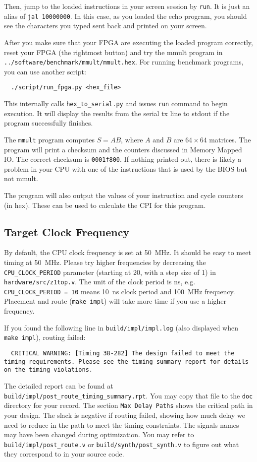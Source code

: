 Then, jump to the loaded instructions in your screen session by \verb|run|.
It is just an alias of \verb|jal 10000000|.
In this case, as you loaded the echo program, you should see the characters you typed
sent back and printed on your screen.

After you make sure that your FPGA are executing the loaded program correctly,
reset your FPGA (the rightmost button) and try the mmult program
in \verb|../software/benchmark/mmult/mmult.hex|.
For running benchmark programs, you can use another script:
\begin{verbatim}
  ./script/run_fpga.py <hex_file>
\end{verbatim}
This internally calls \verb|hex_to_serial.py| and issues \verb|run| command to begin execution.
It will display the results from the serial tx line to stdout if the program successfully finishes.

The \verb|mmult| program computes $S=AB$, where $A$ and $B$ are $64 \times 64$ matrices.
The program will print a checksum and the counters discussed in Memory Mapped IO.
The correct checksum is \verb|0001f800|.
If nothing printed out, there is likely a problem in your CPU with one of the instructions that is used by the BIOS but not mmult.

The program will also output the values of your instruction and cycle counters (in hex).
These can be used to calculate the CPI for this program.

\subsection{Target Clock Frequency}\label{sec:target_clock_frequency}
By default, the CPU clock frequency is set at 50~MHz.
It should be easy to meet timing at 50~MHz.
Please try higher frequencies by decreasing the \verb|CPU_CLOCK_PERIOD| parameter
(starting at 20, with a step size of 1) in \verb|hardware/src/z1top.v|.
The unit of the clock period is ns,
e.g. \verb|CPU_CLOCK_PERIOD = 10| means 10~ns clock period and 100~MHz frequency.
Placement and route (\verb|make impl|) will take more time if you use a higher frequency.

If you found the following line in \verb|build/impl/impl.log|
(also displayed when \verb|make impl|), routing failed:
\begin{verbatim}
  CRITICAL WARNING: [Timing 38-282] The design failed to meet the timing requirements. Please see the timing summary report for details on the timing violations.
\end{verbatim}
The detailed report can be found at \verb|build/impl/post_route_timing_summary.rpt|.
You may copy that file to the \verb|doc| directory for your record.
The section \verb|Max Delay Paths| shows the critical path in your design.
The slack is negative if routing failed, showing how much delay we need to reduce in the path
to meet the timing constraints.
The signals names may have been changed during optimization.
You may refer to \verb|build/impl/post_route.v| or \verb|build/synth/post_synth.v|
to figure out what they correspond to in your source code.


\newpage

